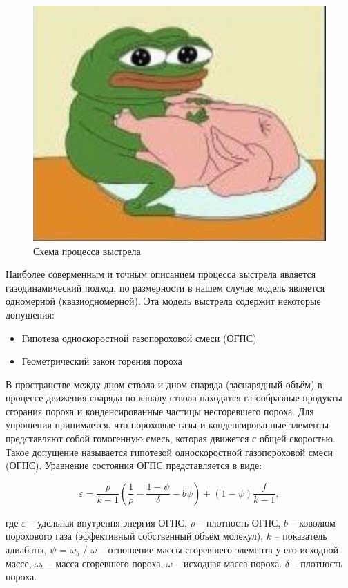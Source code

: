 \documentclass[14pt, a4paper]{report} %
\begin{document}
\begin{figure}[h!]
\centering
\includegraphics[width=0.3\textheight]{imgs/1.jpg}
\caption{Схема процесса выстрела}
\end{figure}

Наиболее соверменным и точным описанием процесса выстрела является газодинамический подход, 
по размерности в нашем случае модель является одномерной (квазиодномерной). Эта модель выстрела содержит некоторые допущения: 
\begin{itemize}
    \item Гипотеза односкоростной газопороховой смеси (ОГПС)
    \item Геометрический закон горения пороха
\end{itemize}


    В пространстве между дном ствола и дном снаряда (заснарядный объём) в процессе движения снаряда 
по каналу ствола находятся газообразные продукты сгорания пороха и конденсированные частицы несгоревшего пороха.
Для упрощения принимается, что пороховые газы и конденсированные элементы представляют собой гомогенную смесь, которая движется 
с общей скоростью. Такое допущение называется гипотезой односкоростной газопороховой смеси (ОГПС). Уравнение состояния ОГПС представляется в виде: 

\begin{equation}
\varepsilon = \frac{p}{k - 1} \left( \frac{1}{\rho} - \frac{1 - \psi}{\delta} - b \psi \right) + (1 - \psi) \frac{f}{k - 1},
\label{eq:epsilon}
\end{equation}

где $\varepsilon$ -- удельная внутрення энергия ОГПС, $\rho$ -- плотность ОГПС, $b$ -- коволюм порохового газа (эффективный собственный объём молекул), $k$ -- показатель адиабаты, 
$\psi$ = $\omega_b$ / $\omega$ -- отношение массы сгоревшего элемента у его исходной массе, $\omega_b$ -- масса сгоревшего пороха, $\omega$ -- исходная масса пороха. $\delta$ -- плотность пороха. 
\end{document}
